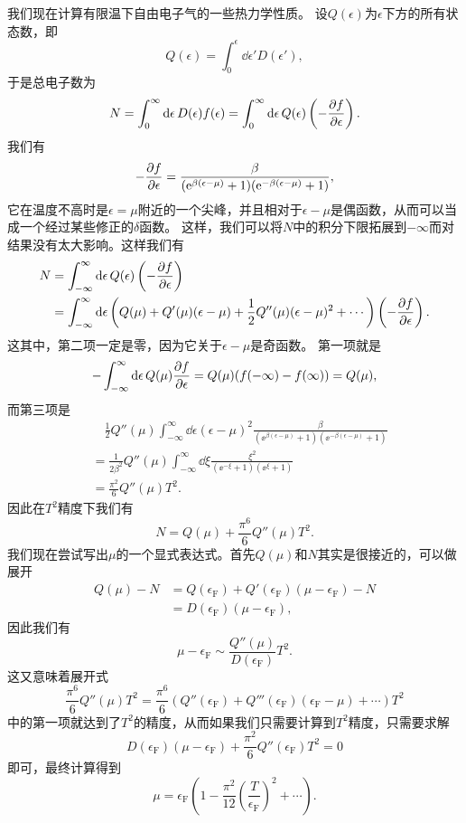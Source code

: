 我们现在计算有限温下自由电子气的一些热力学性质。
设$Q(\epsilon)$为$\epsilon$下方的所有状态数，即
\begin{equation}
    Q(\epsilon) = \int_0^\epsilon \dd{\epsilon'} D(\epsilon'),
\end{equation}
于是总电子数为
\[
    N = \int_0^\infty \dd{\epsilon} D(\epsilon) f(\epsilon) = \int_0^\infty \dd{\epsilon} Q(\epsilon) \left( - \pdv{f}{\epsilon} \right).
\]
我们有
\[
    - \pdv{f}{\epsilon} = \frac{\beta}{(\mathrm{e}^{\beta (\epsilon - \mu)} + 1) (\mathrm{e}^{- \beta (\epsilon - \mu)} + 1)},
\]
它在温度不高时是$\epsilon = \mu$附近的一个尖峰，并且相对于$\epsilon - \mu$是偶函数，从而可以当成一个经过某些修正的$\delta$函数。
这样，我们可以将$N$中的积分下限拓展到$-\infty$而对结果没有太大影响。这样我们有
\[
    \begin{aligned}
        N &= \int_{-\infty}^\infty \dd{\epsilon} Q(\epsilon) \left(-\pdv{f}{\epsilon}\right) \\
        &= \int_{-\infty}^\infty \dd{\epsilon} \left( Q(\mu) + Q'(\mu) (\epsilon - \mu) + \frac{1}{2} Q''(\mu) (\epsilon - \mu)^2 + \cdots \right) \left(-\pdv{f}{\epsilon}\right) .
    \end{aligned}
\]
这其中，第二项一定是零，因为它关于$\epsilon - \mu$是奇函数。
第一项就是
\[
    - \int_{-\infty}^\infty \dd{\epsilon} Q(\mu) \pdv{f}{\epsilon} = Q(\mu) (f(-\infty) - f(\infty)) = Q(\mu), 
\]
而第三项是
\[
    \begin{aligned}
        &\quad \frac{1}{2} Q''(\mu) \int_{-\infty}^\infty \dd{\epsilon} (\epsilon - \mu)^2 \frac{\beta}{(\ee^{\beta (\epsilon - \mu)} + 1) (\ee^{- \beta (\epsilon - \mu)} + 1)} \\
        &= \frac{1}{2 \beta^2} Q''(\mu) \int_{-\infty}^\infty \dd{\xi} \frac{\xi^2}{(\ee^{-\xi} + 1) (\ee^{\xi} + 1)} \\
        &= \frac{\pi^2}{6} Q''(\mu) T^2.
    \end{aligned}
\]
因此在$T^2$精度下我们有
\begin{equation}
    N = Q(\mu) + \frac{\pi^6}{6} Q''(\mu) T^2.
\end{equation}
我们现在尝试写出$\mu$的一个显式表达式。首先$Q(\mu)$和$N$其实是很接近的，可以做展开
\[
    \begin{aligned}
        Q(\mu) - N &= Q(\epsilon_\text{F}) + Q'(\epsilon_\text{F}) (\mu - \epsilon_\text{F}) - N \\
        &= D(\epsilon_\text{F}) (\mu - \epsilon_\text{F}),
    \end{aligned}
\]
因此我们有
\[
    \mu - \epsilon_\text{F} \sim \frac{Q''(\mu)}{D(\epsilon_\text{F})} T^2.
\]
这又意味着展开式
\[
    \frac{\pi^6}{6} Q''(\mu) T^2 = \frac{\pi^6}{6} \left( Q''(\epsilon_\text{F}) + Q'''(\epsilon_\text{F}) (\epsilon_\text{F} - \mu) + \cdots \right) T^2
\]
中的第一项就达到了$T^2$的精度，从而如果我们只需要计算到$T^2$精度，只需要求解
\[
    D(\epsilon_\text{F}) (\mu - \epsilon_\text{F}) + \frac{\pi^2}{6} Q''(\epsilon_\text{F}) T^2 = 0
\]
即可，最终计算得到
\begin{equation}
    \mu = \epsilon_\text{F} \left( 1 - \frac{\pi^2}{12} \left( \frac{T}{\epsilon_\text{F}} \right)^2 + \cdots \right).
\end{equation}

